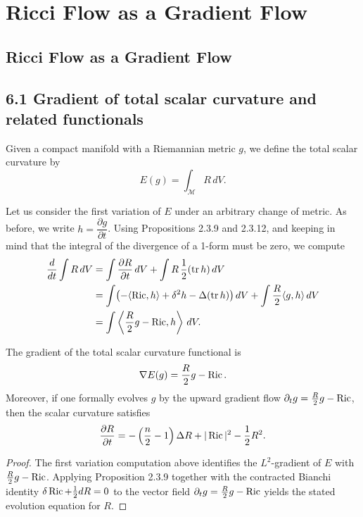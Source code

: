 \chapter{Ricci Flow as a Gradient Flow}

\section{Ricci Flow as a Gradient Flow}

\section{6.1 \quad Gradient of total scalar curvature and related functionals}

Given a compact manifold with a Riemannian metric $g$, we define the total scalar curvature by
\[
E(g)=\int_{\mathcal M} R\,dV.
\]

Let us consider the first variation of $E$ under an arbitrary change of metric.
As before, we write $h=\dfrac{\partial g}{\partial t}$. Using Propositions 2.3.9 and 2.3.12, and
keeping in mind that the integral of the divergence of a 1-form must be
zero, we compute
\[
\begin{aligned}
\frac{d}{dt}\int R\,dV
&=\int \frac{\partial R}{\partial t}\,dV+\int R\,\frac12(\operatorname{tr} h)\,dV\\
&=\int \bigl(-\langle \operatorname{Ric},h\rangle+\delta^2h-\Delta(\operatorname{tr} h)\bigr)\,dV+\int \frac{R}{2}\langle g,h\rangle\,dV\\
&=\int \left\langle \frac{R}{2}g-\operatorname{Ric},h\right\rangle\,dV.
\end{aligned}
\]

\begin{proposition}
\label{topping-gradient-flow-total-scalar-curvature-gradient}
The gradient of the total scalar curvature functional is
\[
\nabla E(g)=\frac{R}{2}g-\operatorname{Ric}.
\]
Moreover, if one formally evolves $g$ by the upward gradient flow $\partial_t g=\frac{R}{2}g-\operatorname{Ric}$, then the scalar curvature satisfies
\[
\frac{\partial R}{\partial t}
=-\left(\frac{n}{2}-1\right)\Delta R+|\operatorname{Ric}|^2-\frac12 R^2.
\]
\end{proposition}

\begin{proof}
The first variation computation above identifies the $L^2$-gradient of $E$ with $\frac{R}{2}g-\operatorname{Ric}$. Applying Proposition 2.3.9 together with the contracted Bianchi identity $\delta\operatorname{Ric}+\frac12 dR=0$ to the vector field $\partial_t g=\frac{R}{2}g-\operatorname{Ric}$ yields the stated evolution equation for $R$.
\end{proof}

